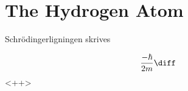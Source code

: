 \section{The Hydrogen Atom}
Schrödingerligningen skrives

\begin{equation}
    \frac{-\hbar}{2m}\diff
    \label{<+label+>}
\end{equation}<++>

